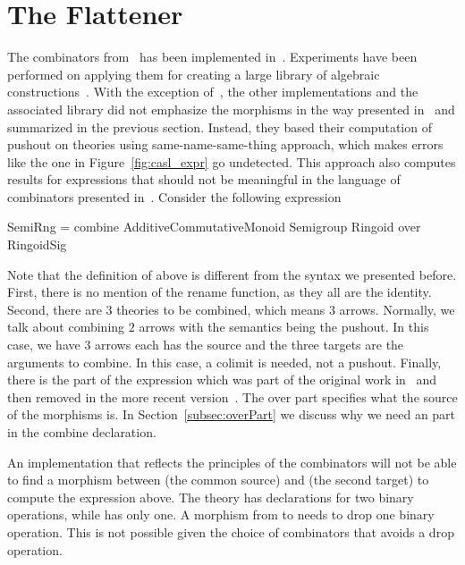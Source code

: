 \section{The Flattener}
\label{sec:lib_implementation}
The combinators from~\cite{carette2018building} has been implemented in~. 
Experiments have been performed on applying them for creating a large library of algebraic constructions~\cite{mathscheme2011experiments}. With the exception of~\cite{cicm2019diagrams}, the other implementations and the associated library did not emphasize the morphisms in the way presented in~\cite{carette2018building} and summarized in the previous section. Instead, they based their computation of pushout on theories using same-name-same-thing approach, which makes errors like the one in Figure~\ref{fig:casl_expr} go undetected.  
This approach also computes results for expressions that should not be meaningful in the language of combinators presented in~\cite{carette2018building}. Consider the following expression
\begin{togcode}
SemiRng = combine AdditiveCommutativeMonoid Semigroup Ringoid
          over RingoidSig
\end{togcode}
Note that the definition of  above is different from the syntax we presented before. First, there is no mention of the rename function, as they all are the identity. Second, there are $3$ theories to be combined, which means $3$ arrows. Normally, we talk about combining $2$ arrows with the semantics being the pushout. In this case, we have $3$ arrows each has the source  and the three targets are the arguments to combine. In this case, a colimit is needed, not a pushout. Finally, there is the  part of the expression which was part of the original work in~\cite{CaretteOConnorTPC} and then removed in the more recent version~\cite{carette2018building}. The over part specifies what the source of the morphisms is. In Section~\ref{subsec:overPart} we discuss why we need an  part in the combine declaration. 

An implementation that reflects the principles of the combinators will not be able to find a morphism between  (the common source) and  (the second target) to compute the expression above. 
The theory  has declarations for two binary operations, while  has only one. A morphism from  to  needs to drop one binary operation. This is not possible given the choice of combinators that avoids a drop operation. 

